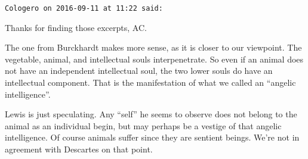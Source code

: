 \begin{footnotesize}
\begin{sffamily}
\hfill

\texttt{Cologero on 2016-09-11 at 11:22 said: }

Thanks for finding those excerpts, AC.

The one from Burckhardt makes more sense, as it is closer to our viewpoint. The vegetable, animal, and intellectual souls interpenetrate. So even if an animal does not have an independent intellectual soul, the two lower souls do have an intellectual component. That is the manifestation of what we called an “angelic intelligence”.

Lewis is just speculating. Any “self” he seems to observe does not belong to the animal as an individual begin, but may perhaps be a vestige of that angelic intelligence. Of course animals suffer since they are sentient beings. We're not in agreement with Descartes on that point.


\end{sffamily}\end{footnotesize}

